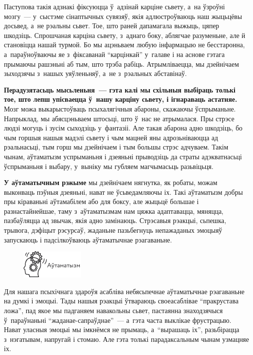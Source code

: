 
Паступова такія адзнакі фіксуюцца ў~адзінай карціне сьвету, а~на ўзроўні мозгу~--- у~сыстэме сінаптычных сувязяў, якія адлюстроўваюць наш жыцьцёвы досьвед, а~не рэальны сьвет. Тое, што раней дапамагала выжыць, цяпер шкодзіць. Спрошчаная карціна сьвету, з~аднаго боку, аблягчае разуменьне, але й становіцца нашай турмой. Бо мы ацэньваем любую інфармацыю не бесстаронна, а~параўноўваючы яе з~фіксаванай ``карцінкай'' у~галаве і на аснове гэтага прымаючы рашэньні аб тым, што трэба рабіць. Атрымліваецца, мы дзейнічаем зыходзячы з~нашых уяўленьняў, а~не з~рэальных абставінаў.

\textbf{Перадузятасьць мысьленьня~--- гэта калі мы схільныя выбіраць толькі тое, што лепш упісваецца ў~нашу карціну сьвету, і ігнараваць астатняе.} Мозг можа выкарыстоўваць псыхалягічныя абароны, скажаючы ўспрыманьне. Напрыклад, мы абясцэньваем штосьці, што ў~нас не атрымалася. Пры стрэсе людзі могуць і зусім сыходзіць у~фантазіі. Але такая абарона адно шкодзіць, бо чым горшыя нашыя мадэлі сьвету і чым мацней яны адрозьніваюцца ад рэальнасьці, тым горш мы дзейнічаем і тым большы стрэс адчуваем. Такім чынам, аўтаматызм успрыманьня і дзеяньні прыводзіць да страты адэкватнасьці ўспрыманьня і выбару, у~выніку мы губляем магчымасьць разьвіцьця.

\textbf{У аўтаматычным рэжыме} мы дзейнічаем нягнутка, як робаты, можам выконваць пэўныя дзеяньні, нават не ўсьведамляючы іх. Такі аўтаматызм добры пры кіраваньні аўтамабілем або для боксу, але жыцьцё большае і разнастайнейшае, таму з~аўтаматызмам нам цяжка адаптавацца, мяняцца, пазбаўляцца ад звычак, якія адно замінаюць. Стрэсавыя рэакцыі, сьпешка, трывога, дэфіцыт рэсурсаў, жаданьне пазьбегнуць непажаданых эмоцыяў запускаюць і падсілкоўваюць аўтаматычнае рэагаваньне.

\begin{figure}[htb!]
  \centering
  \includegraphics[scale=1.5]{willpower/ch8/6.pdf}
\end{figure}

Для нашага псыхічнага здароўя асабліва небясьпечнае аўтаматычнае рэагаваньне на думкі і эмоцыі. Тады нашыя рэакцыі ўтвараюць своеасаблівае ``пракрустава ложа'', пад якое мы падганяем навакольны сьвет, пастаянна знаходзячыся ў~параўнаньні ``жаданае-сапраўднае''~--- а~гэта часта выклікае фрустрацыю. Нават уласныя эмоцыі мы імкнёмся не прымаць, а~``вырашаць іх'', разьбірацца з~нэгатывам, напругай і стомаю. Але гэта толькі парадаксальным чынам узмацняе іх.

